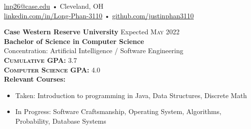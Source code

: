 \documentclass[a4paper,11pt]{article}
\begin{document}
 
 
\begin{center} 
\href{mailto:lnp26@case.edu}{lnp26@case.edu} • Cleveland, OH \\
\href{https://linkedin.com/in/Long-Phan-3110/}{linkedin.com/in/Long-Phan-3110} • \href{http://github.com/justinphan3110}{github.com/justinphan3110}
\noindent\makebox[\linewidth]{\rule{\paperwidth}{2pt}}
\end{center}

\begin{flushleft}
	\textbf{Case Western Reserve University } \hspace{1cm} Expected \textsc{May} 2022 \\
	\textbf{Bachelor of Science in Computer Science} \\
	Concentration: Artificial Intelligence / Software Engineering \\
	\textbf{\textsc{Cumulative GPA:}} 3.7 \\
	\textbf{\textsc{Computer Science GPA:}} 4.0 \\ 
    \textbf{Relevant Courses:} 
    \vspace{-\topsep}
    	\begin{itemize}
    		\setlength{\parskip}{0pt}
    		\setlength{\itemsep}{0pt plus 1pt}
    		\item Taken: Introduction to programming in Java, Data Structures, Discrete Math 
    		\item In Progress: Software Craftsmanship, Operating System, Algorithms, Probability, Database Systems
        \end{itemize}
    		
	\centering{\noindent\makebox{\rule{8cm}{1.5pt}}}
\end{flushleft}
\end{document}
